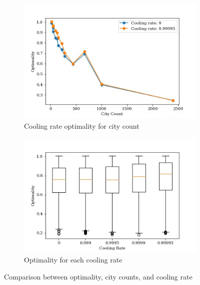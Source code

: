 \documentclass{article}
\begin{document}
\begin{figure}[H]
\centering
    \begin{subfigure}{0.5\textwidth}
        \centering
        \includegraphics[width=0.95\linewidth]{images/tsplib_optimality_city_count.jpg}
        \caption{Cooling rate optimality for city count}
        \label{fig:sub1}
    \end{subfigure}%
    \begin{subfigure}{0.5\textwidth}
        \centering
        \includegraphics[width=0.95\linewidth]{images/tsplib_optimality_cooling_rate.jpg}
        \caption{Optimality for each cooling rate}
        \label{fig:sub2}
    \end{subfigure}
    \caption{Comparison between optimality, city counts, and cooling rate}
\end{figure}
\end{document}
